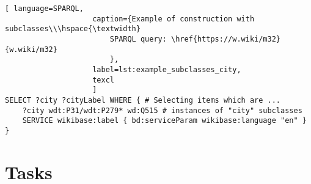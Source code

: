 \begin{lstlisting}[ language=SPARQL, 
                    caption={Example of construction with subclasses\\\hspace{\textwidth}
                        SPARQL query: \href{https://w.wiki/m32}{w.wiki/m32}
                        },
                    label=lst:example_subclasses_city,
                    texcl 
                    ]
SELECT ?city ?cityLabel WHERE { # Selecting items which are ...
	?city wdt:P31/wdt:P279* wd:Q515 # instances of "city" subclasses
	SERVICE wikibase:label { bd:serviceParam wikibase:language "en" }
}
\end{lstlisting}%


\section{Tasks}